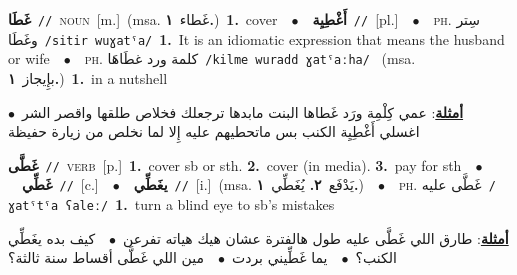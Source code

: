 \documentclass[10pt,a4paper,twoside]{article} %
\begin{document}
\begin{multicols}{2}
{\setlength\topsep{0pt}\textbf{\foreignlanguage{arabic}{غَطَا}}\ {\color{gray}\texttt{//}\color{black}}\ \textsc{noun}\ [m.]\ \color{gray}(msa. \foreignlanguage{arabic}{غَطاء}~\foreignlanguage{arabic}{\textbf{١.}})\color{black}\ \textbf{1.}~cover\ \ $\bullet$\ \ \setlength\topsep{0pt}\textbf{\foreignlanguage{arabic}{أَغْطِيِة}}\ {\color{gray}\texttt{//}\color{black}}\ [pl.]\ \ $\bullet$\ \ \textsc{ph.} \color{gray} \foreignlanguage{arabic}{سِتر وغَطَا}\color{black}\ {\color{gray}\texttt{/{\sffamily sitir wuɣatˤa}/}\color{black}}\ \textbf{1.}~It is an idiomatic expression that means the husband or wife\ \ $\bullet$\ \ \textsc{ph.} \color{gray} \foreignlanguage{arabic}{كلمة ورد غطَاهَا}\color{black}\ {\color{gray}\texttt{/{\sffamily kilme wuradd ɣatˤaːha}/}\color{black}}\ \color{gray} (msa. \foreignlanguage{arabic}{بإِيجاز}~\foreignlanguage{arabic}{\textbf{١.}})\color{black}\ \textbf{1.}~in a nutshell\  \begin{flushright}\color{gray}\foreignlanguage{arabic}{\textbf{\underline{\foreignlanguage{arabic}{أمثلة}}}: عمي كِلْمِة ورَد غَطاها البنت مابدها ترجعلك فخلاص طلقها واقصر الشر\ $\bullet$\ \  اغسلي أَغْطِيِة الكنب بس ماتحطيهم عليه إِلا لما نخلص من زيارة حفيظة}\end{flushright}\color{black}} \vspace{2mm}

{\setlength\topsep{0pt}\textbf{\foreignlanguage{arabic}{غَطَّى}}\ {\color{gray}\texttt{//}\color{black}}\ \textsc{verb}\ [p.]\ \textbf{1.}~cover sb or sth.  \textbf{2.}~cover (in media).  \textbf{3.}~pay for sth\ \ $\bullet$\ \ \setlength\topsep{0pt}\textbf{\foreignlanguage{arabic}{غَطِّي}}\ {\color{gray}\texttt{//}\color{black}}\ [c.]\ \ $\bullet$\ \ \setlength\topsep{0pt}\textbf{\foreignlanguage{arabic}{يغَطِّي}}\ {\color{gray}\texttt{//}\color{black}}\ [i.]\ \color{gray}(msa. \foreignlanguage{arabic}{يَدْفَع}~\foreignlanguage{arabic}{\textbf{٢.}}  \foreignlanguage{arabic}{يُغَطِّي}~\foreignlanguage{arabic}{\textbf{١.}})\color{black}\ \ $\bullet$\ \ \textsc{ph.} \color{gray} \foreignlanguage{arabic}{غَطَّى عليه}\color{black}\ {\color{gray}\texttt{/{\sffamily ɣatˤtˤa ʕaleː}/}\color{black}}\ \textbf{1.}~turn a blind eye to sb's mistakes\  \begin{flushright}\color{gray}\foreignlanguage{arabic}{\textbf{\underline{\foreignlanguage{arabic}{أمثلة}}}: طارق اللي غَطَّى عليه طول هالفترة عشان هيك هياته تفرعن\ $\bullet$\ \  كيف بده يغَطِّي الكنب؟\ $\bullet$\ \  يما غَطِّيني بردت\ $\bullet$\ \  مين اللي غَطَّى أقساط سنة ثالثة؟}\end{flushright}\color{black}} \vspace{2mm}


\end{multicols}
\end{document}
